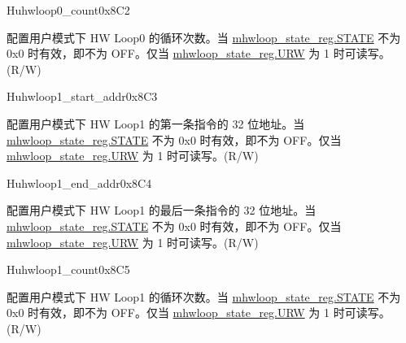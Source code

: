 \begin{register}{H}{uhwloop0\_count}{0x8C2}\label{regdesc:uhloop0_count}
%
%
\regnewline%
\begin{regdesc}\begin{reglist}
\label{fielddesc:UHWLP0_CNT}\item [Count] 配置用户模式下 HW Loop0 的循环次数。当 \hyperref[fielddesc:HWSTATE]{mhwloop\_state\_reg.STATE} 不为 0x0 时有效，即不为 OFF。仅当 \hyperref[fielddesc:HWSTATE]{mhwloop\_state\_reg.URW} 为 1 时可读写。(R/W)
\end{reglist}\end{regdesc}
\end{register}

\begin{register}{H}{uhwloop1\_start\_addr}{0x8C3}\label{regdesc:uhloop1_start_addr}
%
\regnewline%
\begin{regdesc}\begin{reglist}
\label{fielddesc:UHWLP1_SA}\item [SA] 配置用户模式下 HW Loop1 的第一条指令的 32 位地址。当 \hyperref[fielddesc:HWSTATE]{mhwloop\_state\_reg.STATE} 不为 0x0 时有效，即不为 OFF。仅当 \hyperref[fielddesc:HWSTATE]{mhwloop\_state\_reg.URW} 为 1 时可读写。(R/W)
\end{reglist}\end{regdesc}
\end{register}

\begin{register}{H}{uhwloop1\_end\_addr}{0x8C4}\label{regdesc:uhloop1_end_addr}
%
\regnewline%
\begin{regdesc}\begin{reglist}
\label{fielddesc:UHWLP1_EA}\item [EA] 配置用户模式下 HW Loop1 的最后一条指令的 32 位地址。当 \hyperref[fielddesc:HWSTATE]{mhwloop\_state\_reg.STATE} 不为 0x0 时有效，即不为 OFF。仅当 \hyperref[fielddesc:HWSTATE]{mhwloop\_state\_reg.URW} 为 1 时可读写。(R/W)
\end{reglist}\end{regdesc}
\end{register}

\begin{register}{H}{uhwloop1\_count}{0x8C5}\label{regdesc:uhloop1_count}
%
%
\regnewline%
\begin{regdesc}\begin{reglist}
\label{fielddesc:UHWLP1_CNT}\item [Count] 配置用户模式下 HW Loop1 的循环次数。当 \hyperref[fielddesc:HWSTATE]{mhwloop\_state\_reg.STATE} 不为 0x0 时有效，即不为 OFF。仅当 \hyperref[fielddesc:HWSTATE]{mhwloop\_state\_reg.URW} 为 1 时可读写。(R/W)
\end{reglist}\end{regdesc}
\end{register}